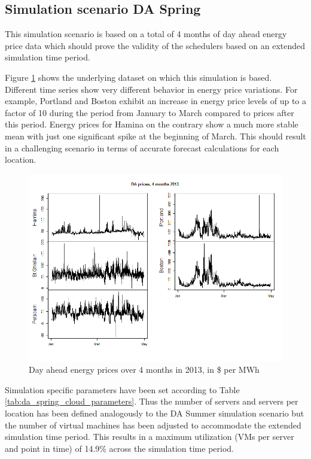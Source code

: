 \subsection{Simulation scenario DA Spring} \label{ssec:simulation_scenario_da_spring}

This simulation scenario is based on a total of 4 months of day ahead energy price data which should prove the validity of the schedulers based on an extended simulation time period. 

Figure \ref{fig:da_sim_2013_4months} shows the underlying dataset on which this simulation is based. 
Different time series show very different behavior in energy price variations. For example, Portland and Boston exhibit an increase in energy price levels of up to a factor of 10 during the period from January to March compared to prices after this period. Energy prices for Hamina on the contrary show a much more stable mean with just one significant spike at the beginning of March. This should result in a challenging scenario in terms of accurate forecast calculations for each location. 



\begin{figure}[htbp]
	\centering
		\includegraphics[width=1.0\textwidth]{figures/evaluation_and_results/da_sim_2013_4months.png}
	\caption{Day ahead energy prices over 4 months in 2013, in \$ per MWh}
	\label{fig:da_sim_2013_4months}
\end{figure}

Simulation specific parameters have been set according to Table \ref{tab:da_spring_cloud_parameters}. Thus the number of servers and servers per location has been defined analogously to the DA Summer simulation scenario but the number of virtual machines has been adjusted to accommodate the extended simulation time period. This results in a maximum utilization (VMs per server and point in time) of 14.9\% across the simulation time period. 

